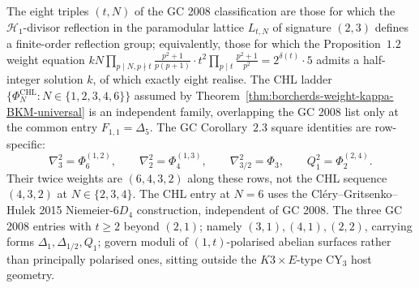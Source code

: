 \begin{remark}
\label{rem:gritsenko-clery-orbit}
The eight triples $(t, N)$ of the GC 2008 classification are those for
which the $\mathcal{H}_1$-divisor reflection in the paramodular lattice
$L_{t, N}$ of signature $(2, 3)$ defines a finite-order reflection group;
equivalently, those for which the Proposition~$1.2$ weight equation
$kN \prod_{p \mid N, p \nmid t} \tfrac{p^2 + 1}{p(p + 1)} \cdot t^2
\prod_{p \mid t} \tfrac{p^2 + 1}{p^2} = 2^{\delta(t)} \cdot 5$ admits a
half-integer solution $k$, of which exactly eight realise. The CHL ladder
$\{\Phi_N^{\mathrm{CHL}} : N \in \{1, 2, 3, 4, 6\}\}$ assumed by
Theorem~\ref{thm:borcherds-weight-kappa-BKM-universal} is an independent
family, overlapping the GC 2008 list only at the common entry
$F_{1, 1} = \Delta_5$. The GC Corollary~$2.3$ square identities are
row-specific:
\[
        \nabla_3^2=\Phi_6^{(1,2)},\qquad
        \nabla_2^2=\Phi_4^{(1,3)},\qquad
        \nabla_{3/2}^2=\Phi_3,\qquad
        Q_1^2=\Phi_2^{(2,4)} .
\]
Their twice weights are $(6,4,3,2)$ along these rows, not the CHL
sequence $(4,3,2)$ at $N\in\{2,3,4\}$. The CHL entry at $N = 6$ uses the
Cl\'ery--Gritsenko--Hulek 2015 Niemeier-$6D_4$ construction,
independent of GC 2008. The three GC 2008 entries with $t \geq 2$
beyond $(2, 1)$; namely $(3, 1), (4, 1), (2, 2)$, carrying forms
$\Delta_1, \Delta_{1/2}, Q_1$; govern moduli of $(1, t)$-polarised
abelian surfaces rather than principally polarised ones, sitting
outside the $K3 \times E$-type CY$_3$ host geometry.
\end{remark}

